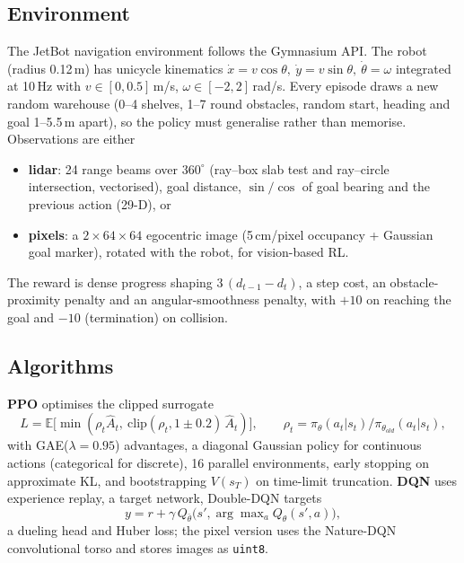 \documentclass[11pt,a4paper]{article}
\begin{document}
\subsection{Environment}
The JetBot navigation environment follows the Gymnasium API. The robot (radius 0.12\,m) has unicycle
kinematics $\dot x=v\cos\theta,\ \dot y=v\sin\theta,\ \dot\theta=\omega$ integrated at 10\,Hz with
$v\in[0,0.5]$\,m/s, $\omega\in[-2,2]$\,rad/s. Every episode draws a new random warehouse
(0--4 shelves, 1--7 round obstacles, random start, heading and goal 1--5.5\,m apart), so the policy
must generalise rather than memorise. Observations are either
\begin{itemize}
\item \textbf{lidar}: 24 range beams over $360^\circ$ (ray--box slab test and ray--circle intersection,
vectorised), goal distance, $\sin/\cos$ of goal bearing and the previous action (29-D), or
\item \textbf{pixels}: a $2\times64\times64$ egocentric image (5\,cm/pixel occupancy + Gaussian goal marker),
rotated with the robot, for vision-based RL.
\end{itemize}
The reward is dense progress shaping $3\,(d_{t-1}-d_t)$, a step cost, an obstacle-proximity penalty
and an angular-smoothness penalty, with $+10$ on reaching the goal and $-10$ (termination) on collision.

\subsection{Algorithms}
\textbf{PPO} optimises the clipped surrogate
\[L=\mathbb{E}\big[\min(\rho_t\hat A_t,\ \mathrm{clip}(\rho_t,1\pm0.2)\,\hat A_t)\big],\qquad
\rho_t=\pi_\theta(a_t|s_t)/\pi_{\theta_{old}}(a_t|s_t),\]
with GAE($\lambda=0.95$) advantages, a diagonal Gaussian policy for continuous actions (categorical for discrete), 16 parallel
environments, early stopping on approximate KL, and bootstrapping $V(s_T)$ on time-limit truncation.
\textbf{DQN} uses experience replay, a target network, Double-DQN targets
\[y=r+\gamma\,Q_{\bar\theta}\big(s',\arg\max\nolimits_a Q_\theta(s',a)\big),\]
a dueling head and Huber loss; the pixel
version uses the Nature-DQN convolutional torso and stores images as \texttt{uint8}.
\end{document}
